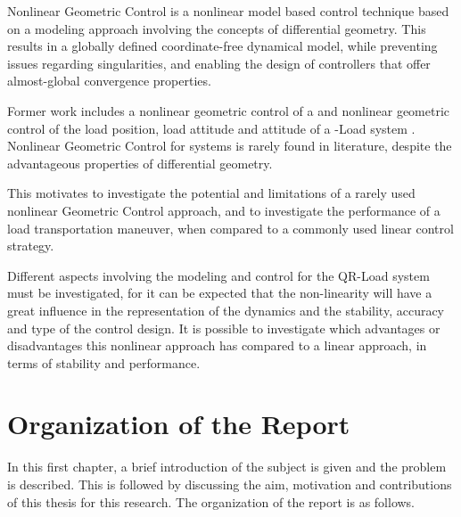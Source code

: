 
Nonlinear Geometric Control is a nonlinear model based control technique based on a modeling approach involving the concepts of differential geometry. This results in a globally defined coordinate-free dynamical model, while preventing issues regarding singularities, and enabling the design of controllers that offer almost-global convergence properties.

Former work includes a nonlinear geometric control of a  \cite{Lee2010,Goodarzi2013a} and nonlinear geometric control of the load position, load attitude and  attitude of a -Load system \cite{Sreenath2013a,Sreenath2013b,Tang2014}.
Nonlinear Geometric Control for  systems is rarely found in literature, despite the advantageous properties of differential geometry. 

This motivates to investigate the potential and limitations of a rarely used nonlinear Geometric Control approach, and to investigate the performance of a load transportation maneuver, when compared to a commonly used linear control strategy.

Different aspects involving the modeling and control for the QR-Load system must be investigated, for it can be expected that the non-linearity will have a great influence in the representation of the dynamics and the stability, accuracy and type of the control design.
It is possible to investigate which advantages or disadvantages this nonlinear approach has compared to a linear approach, in terms of stability and performance.

%

\section{Organization of the Report}

In this first chapter, a brief introduction of the subject is given and the problem is described. This is followed by discussing the aim, motivation and contributions of this thesis for this research. The organization of the report is as follows.

